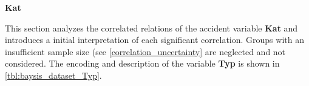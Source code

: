 \Large
\centerline{\textbf{Kat}}
\normalsize
This section analyzes the correlated relations of the accident variable \textbf{Kat} and introduces a initial interpretation of each significant correlation. Groups with an insufficient sample size (see \cref{correlation_uncertainty} are neglected and not considered. The encoding and description of the variable \textbf{Typ} is shown in \cref{tbl:baysis_dataset_Typ}.

